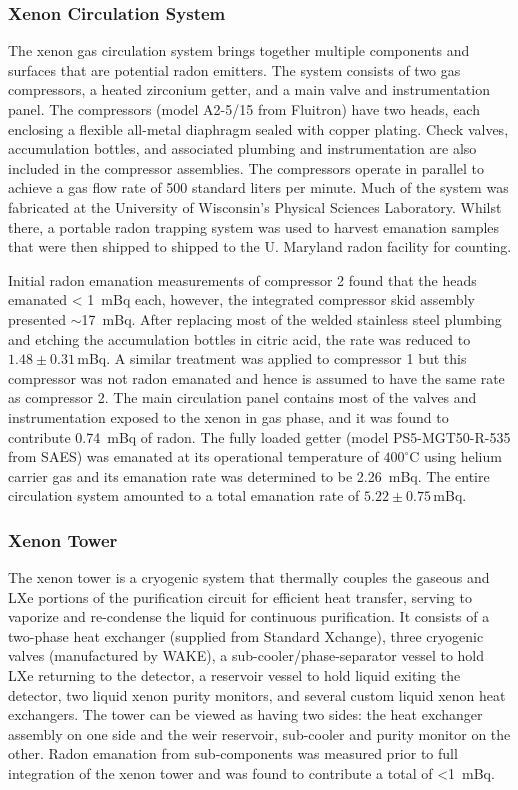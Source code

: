 \subsubsection{Xenon Circulation System}

The xenon gas circulation system brings together multiple components and surfaces that are potential radon emitters. The system consists of two gas compressors, a heated zirconium getter, and a main valve and instrumentation panel. The compressors (model A2-5/15 from Fluitron) have two heads, each enclosing a flexible all-metal diaphragm sealed with copper plating. Check valves, accumulation bottles, and associated plumbing and instrumentation are also included in the compressor assemblies. The compressors operate in parallel to achieve a gas flow rate of 500 standard liters per minute. Much of the system was fabricated at the University of Wisconsin's Physical Sciences Laboratory. Whilst there, a portable radon trapping system was used to harvest emanation samples that were then shipped to shipped to the U. Maryland radon facility for counting.

Initial radon emanation measurements of compressor 2 found that the heads emanated \SI{< 1}{\milli\becquerel} each, however, the integrated compressor skid assembly presented $\sim$\SI{17}{\milli\becquerel}. After replacing most of the welded stainless steel plumbing and etching the accumulation bottles in citric acid, the rate was reduced to $1.48\pm0.31$\,mBq. A similar treatment was applied to compressor 1 but this compressor was not radon emanated and hence is assumed to have the same rate as compressor 2. The main circulation panel contains most of the valves and instrumentation exposed to the xenon in gas phase, and it was found to contribute \SI{0.74}{\milli\becquerel} of radon. The fully loaded getter (model PS5-MGT50-R-535 from SAES) was emanated at its operational temperature of $400 ^{\circ}$C using helium carrier gas and its emanation rate was determined to be \SI{2.26}{\milli\becquerel}. The entire circulation system amounted to a total emanation rate of $5.22\pm0.75$\,mBq.


\subsubsection{Xenon Tower}

The xenon tower is a cryogenic system that thermally couples the gaseous and LXe portions of the purification circuit for efficient heat transfer, serving to vaporize and re-condense the liquid for continuous purification. It consists of a two-phase heat exchanger (supplied from Standard Xchange), three cryogenic valves (manufactured by WAKE), a sub-cooler/phase-separator vessel to hold LXe returning to the detector, a reservoir vessel to hold liquid exiting the detector, two liquid xenon purity monitors, and several custom liquid xenon heat exchangers. The tower can be viewed as having two sides: the heat exchanger assembly on one side and the weir reservoir, sub-cooler and purity monitor on the other. Radon emanation from sub-components was measured prior to full integration of the xenon tower and was found to contribute a total of \SI{<1}{\milli\becquerel}. 

